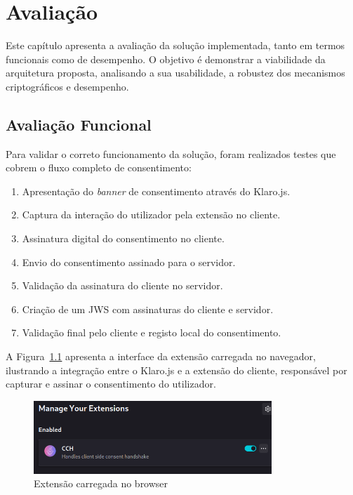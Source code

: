 \chapter{Avaliação}
\label{cap:avaliacao}

Este capítulo apresenta a avaliação da solução implementada, tanto em termos funcionais como de desempenho. O objetivo é demonstrar a viabilidade da arquitetura proposta, analisando a sua usabilidade, a robustez dos mecanismos criptográficos e desempenho.

\section{Avaliação Funcional}

Para validar o correto funcionamento da solução, foram realizados testes que cobrem o fluxo completo de consentimento:

\begin{enumerate}
    \item Apresentação do \textit{banner} de consentimento através do Klaro.js.
    \item Captura da interação do utilizador pela extensão no cliente.
    \item Assinatura digital do consentimento no cliente.
    \item Envio do consentimento assinado para o servidor.
    \item Validação da assinatura do cliente no servidor.
    \item Criação de um JWS com assinaturas do cliente e servidor.
    \item Validação final pelo cliente e registo local do consentimento.
\end{enumerate}

A Figura~\ref{fig:cch} apresenta a interface da extensão carregada no navegador, ilustrando a integração entre o Klaro.js e a extensão do cliente, responsável por capturar e assinar o consentimento do utilizador.

\begin{figure}[h]
    \centering
	\includegraphics[width=0.8\textwidth]{images/cch.png}
    \caption{Extensão carregada no browser}
    \label{fig:cch}
\end{figure}

